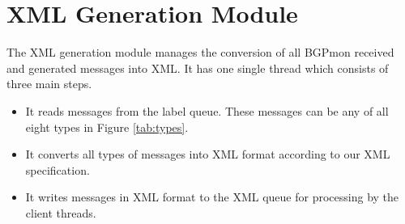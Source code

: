 \section{XML Generation Module}
\label{sec:xml}

The XML generation module manages the conversion of all BGPmon received and generated messages into XML. It has one single thread which consists of three main steps. 
\begin{itemize}
\item{It reads messages from the label queue. These messages can be any of all eight types in Figure \ref{tab:types}.}
\item{It converts all types of messages into XML format according to our XML specification. }
\item{It writes messages in XML format to the XML queue for processing by the client threads.}
\end{itemize}




